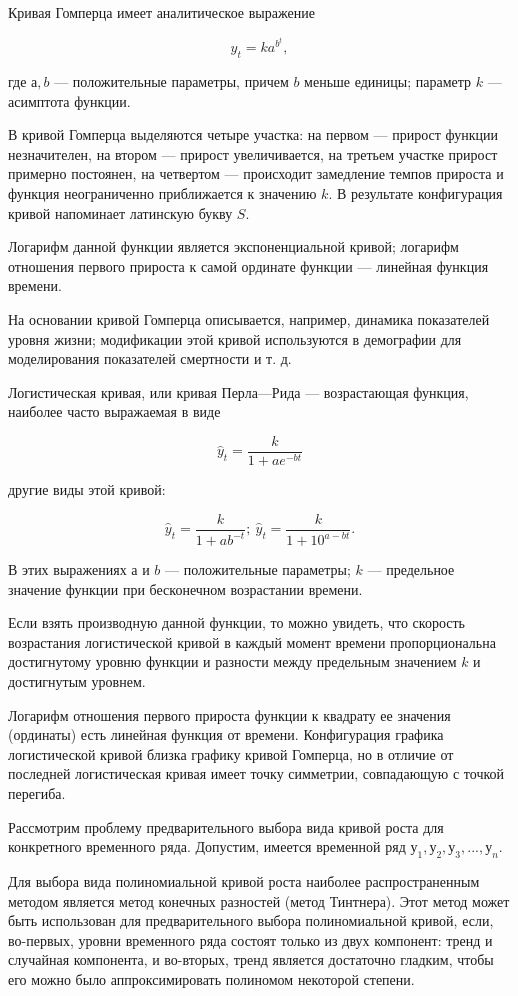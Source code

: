 Кривая Гомперца имеет аналитическое выражение

\[ \hat{y}_t = ka^{b^t}, \]

где $а, b$ --- положительные параметры, причем $b$ меньше единицы; параметр $k$ --- асимптота функции.

В кривой Гомперца выделяются четыре участка: на первом --- прирост функции незначителен, на втором --- прирост увеличивается, на третьем участке прирост примерно постоянен, на четвертом --- происходит замедление темпов прироста и функция неограниченно приближается к значению $k$. В результате конфигурация кривой напоминает латинскую букву $S$.

Логарифм данной функции является экспоненциальной кривой; логарифм отношения первого прироста к самой ординате функции --- линейная функция времени.

На основании кривой Гомперца описывается, например, динамика показателей уровня жизни; модификации этой кривой используются в демографии для моделирования показателей смертности и т. д.

Логистическая кривая, или кривая Перла---Рида --- возрастающая функция, наиболее часто выражаемая в виде

\[ \hat{y}_t = \dfrac{k}{1 + ae^{-bt}} \]

другие виды этой кривой:

\[ \hat{y}_t = \dfrac{k}{1 + ab^{-t}};\  \hat{y}_t = \dfrac{k}{1 + 10^{a-bt}}. \]

В этих выражениях $а$ и $b$ --- положительные параметры; $k$ --- предельное значение функции при бесконечном возрастании времени.

Если взять производную данной функции, то можно увидеть, что скорость возрастания логистической кривой в каждый момент времени пропорциональна достигнутому уровню функции и разности между предельным значением $k$ и достигнутым уровнем.

Логарифм отношения первого прироста функции к квадрату ее значения (ординаты) есть линейная функция от времени.
Конфигурация графика логистической кривой близка графику кривой Гомперца, но в отличие от последней логистическая кривая имеет точку симметрии, совпадающую с точкой перегиба.

Рассмотрим проблему предварительного выбора вида кривой роста для конкретного временного ряда. Допустим, имеется временной ряд $у_1,у_2,у_3,...,у_n$.

Для выбора вида полиномиальной кривой роста наиболее распространенным методом является метод конечных разностей (метод Тинтнера). Этот метод может быть использован для предварительного выбора полиномиальной кривой, если, во-первых, уровни временного ряда состоят только из двух компонент: тренд и случайная компонента, и во-вторых, тренд является достаточно гладким, чтобы его можно было аппроксимировать полиномом некоторой степени.

